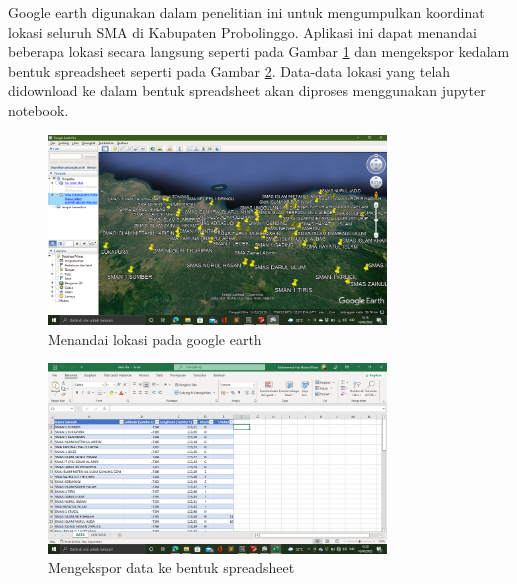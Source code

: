 \begin{enumerate}
	Google earth digunakan dalam penelitian ini untuk mengumpulkan koordinat lokasi seluruh SMA di Kabupaten Probolinggo. Aplikasi ini dapat menandai beberapa lokasi secara langsung seperti pada Gambar \ref{fig:markloc} dan mengekspor kedalam bentuk spreadsheet seperti pada Gambar \ref{fig:eksspread}. Data-data lokasi yang telah didownload ke dalam bentuk spreadsheet akan diproses menggunakan jupyter notebook.

\begin{figure}[H]
  \centering
  \includegraphics[width=0.8\textwidth]{Gambar/google earth.png}
  \caption{Menandai lokasi pada google earth}
  \label{fig:markloc}
\end{figure}

\begin{figure}[H]
  \centering
  \includegraphics[width=0.8\textwidth]{Gambar/ekspor spreadsheet.png}
  \caption{Mengekspor data ke bentuk spreadsheet}
  \label{fig:eksspread}
\end{figure}

\end{enumerate}

